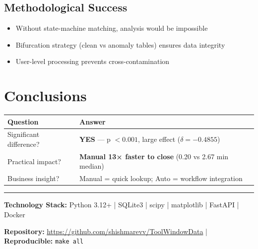\documentclass[11pt,a4paper]{article}
\begin{document}
\subsection{Methodological Success}
\begin{itemize}
    \item Without state-machine matching, analysis would be impossible
    \item Bifurcation strategy (clean vs anomaly tables) ensures data integrity
    \item User-level processing prevents cross-contamination
\end{itemize}

\section{Conclusions}

\begin{table}[H]
\centering
\begin{tabular}{@{}p{}p{}@{}}
\toprule
\textbf{Question} & \textbf{Answer} \\
\midrule
Significant difference? & \textbf{YES} — p $< 0.001$, large effect ($\delta = -0.4855$) \\
Practical impact? & \textbf{Manual 13× faster to close} (0.20 vs 2.67 min median) \\
Business insight? & Manual = quick lookup; Auto = workflow integration \\
\bottomrule
\end{tabular}
\end{table}


\vspace{1em}
\hrule
\vspace{0.5em}

\noindent\textbf{Technology Stack:} Python 3.12+ | SQLite3 | scipy | matplotlib | FastAPI | Docker

\noindent\textbf{Repository:} \url{https://github.com/shishmarevv/ToolWindowData} | \textbf{Reproducible:} \texttt{make all}
\end{document}
